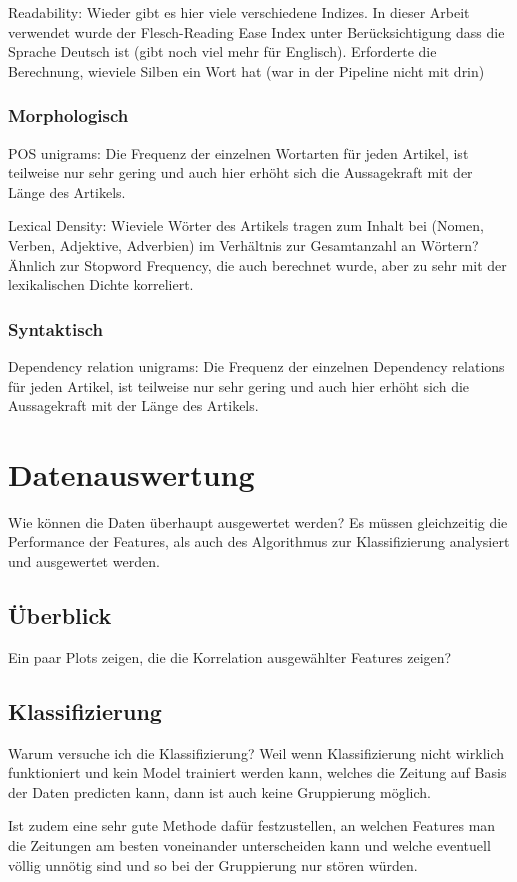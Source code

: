 Readability: Wieder gibt es hier viele verschiedene Indizes. In dieser Arbeit verwendet wurde der Flesch-Reading Ease Index unter Berücksichtigung dass die Sprache Deutsch ist (gibt noch viel mehr für Englisch). Erforderte die Berechnung, wieviele Silben ein Wort hat (war in der Pipeline nicht mit drin)
\subsection{Morphologisch}
POS unigrams: Die Frequenz der einzelnen Wortarten für jeden Artikel, ist teilweise nur sehr gering und auch hier erhöht sich die Aussagekraft mit der Länge des Artikels.

Lexical Density: Wieviele Wörter des Artikels tragen zum Inhalt bei (Nomen, Verben, Adjektive, Adverbien) im Verhältnis zur Gesamtanzahl an Wörtern? Ähnlich zur Stopword Frequency, die auch berechnet wurde, aber zu sehr mit der lexikalischen Dichte korreliert.
\subsection{Syntaktisch}
Dependency relation unigrams: Die Frequenz der einzelnen Dependency relations für jeden Artikel, ist teilweise nur sehr gering und auch hier erhöht sich die Aussagekraft mit der Länge des Artikels.

\chapter{Datenauswertung}
Wie können die Daten überhaupt ausgewertet werden? Es müssen gleichzeitig die Performance der Features, als auch des Algorithmus zur Klassifizierung analysiert und ausgewertet werden.
\section{Überblick}
Ein paar Plots zeigen, die die Korrelation ausgewählter Features zeigen?
\section{Klassifizierung}
Warum versuche ich die Klassifizierung? Weil wenn Klassifizierung nicht wirklich funktioniert und kein Model trainiert werden kann, welches die Zeitung auf Basis der Daten predicten kann, dann ist auch keine Gruppierung möglich.

Ist zudem eine sehr gute Methode dafür festzustellen, an welchen Features man die Zeitungen am besten voneinander unterscheiden kann und welche eventuell völlig unnötig sind und so bei der Gruppierung nur stören würden.
